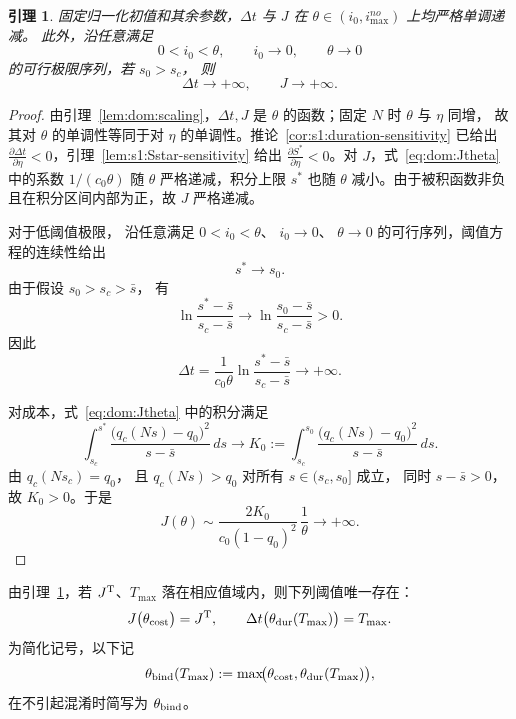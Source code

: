 \documentclass[UTF8,a4paper,10pt,fontset=fandol]{ctexart}
\theoremstyle{cnplain}
\newtheorem{lemma}[theorem]{引理}
\theoremstyle{remark}
\numberwithin{equation}{section}
\begin{document}
\begin{lemma}\label{lem:dom:mono}
固定归一化初值和其余参数，$\Delta t$ 与 $J$ 在 $\theta\in(i_0,i_{\max}^{no})$ 上均严格单调递减。
此外，沿任意满足
\[
0<i_0<\theta,\qquad
i_0\to0,\qquad
\theta\to0
\]
的可行极限序列，若 $s_0>s_c$，
则
\[
\Delta t\to+\infty,
\qquad
J\to+\infty.
\]
\end{lemma}
\begin{proof}
由引理~\ref{lem:dom:scaling}，$\Delta t,J$ 是 $\theta$ 的函数；固定 $N$ 时 $\theta$ 与 $\eta$ 同增，
故其对 $\theta$ 的单调性等同于对 $\eta$ 的单调性。推论~\ref{cor:s1:duration-sensitivity} 已给出
$\frac{\partial \Delta t}{\partial \eta}<0$，引理~\ref{lem:s1:Sstar-sensitivity} 给出 $\frac{\partial S^\ast}{\partial \eta}<0$。对 $J$，式~\eqref{eq:dom:Jtheta} 中的系数 $1/(c_0\theta)$ 随 $\theta$ 严格递减，积分上限 $s^*$ 也随 $\theta$ 减小。由于被积函数非负且在积分区间内部为正，故 $J$ 严格递减。

对于低阈值极限，
沿任意满足
$0<i_0<\theta$、
$i_0\to0$、
$\theta\to0$
的可行序列，阈值方程的连续性给出
\[
  s^\ast\longrightarrow s_0.
\]
由于假设 $s_0>s_c>\bar s$，
有
\[
  \ln\frac{s^\ast-\bar s}{s_c-\bar s}
  \longrightarrow
  \ln\frac{s_0-\bar s}{s_c-\bar s}
  >0.
\]
因此
\[
  \Delta t
  =
  \frac{1}{c_0\theta}
  \ln\frac{s^\ast-\bar s}{s_c-\bar s}
  \longrightarrow+\infty.
\]

对成本，式~\eqref{eq:dom:Jtheta} 中的积分满足
\[
\int_{s_c}^{s^\ast}
\frac{\bigl(q_c(Ns)-q_0\bigr)^2}
     {s-\bar s}\,ds
\longrightarrow
K_0
:=
\int_{s_c}^{s_0}
\frac{\bigl(q_c(Ns)-q_0\bigr)^2}
     {s-\bar s}\,ds.
\]
由
$q_c(Ns_c)=q_0$，
且 $q_c(Ns)>q_0$ 对所有
$s\in(s_c,s_0]$ 成立，
同时 $s-\bar s>0$，
故 $K_0>0$。于是
\[
  J(\theta)
  \sim
  \frac{2K_0}
       {c_0(1-q_0)^2}\,
  \frac{1}{\theta}
  \longrightarrow+\infty.
\]
\end{proof}

由引理~\ref{lem:dom:mono}，若 $J^{\rm T}$、$T_{\max}$ 落在相应值域内，则下列阈值唯一存在：
\begin{equation}
  J\big(\theta_{\rm cost}\big)=J^{\rm T},\qquad
  \Delta t\big(\theta_{\rm dur}(T_{\max})\big)=T_{\max}.
  \label{eq:dom:thetadefs}
\end{equation}
为简化记号，以下记
\begin{equation}
  \theta_{\rm bind}(T_{\max})
  :=
  \max\!\bigl(
    \theta_{\rm cost},
    \theta_{\rm dur}(T_{\max})
  \bigr),
  \label{eq:dom:theta-bind}
\end{equation}
在不引起混淆时简写为 $\theta_{\rm bind}$。
\end{document}
